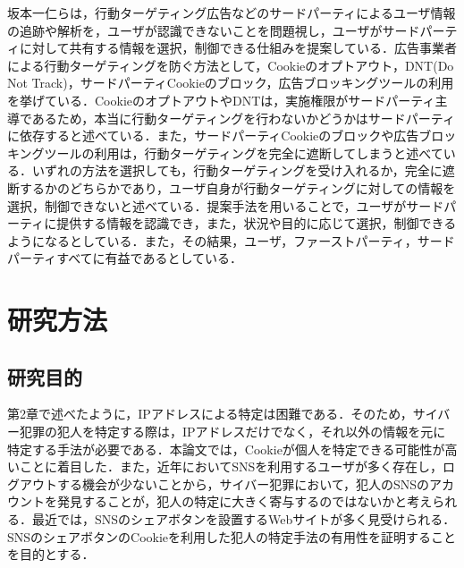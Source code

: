 \documentclass[10pt, a4paper]{jreport}
\begin{document}
坂本一仁らは，行動ターゲティング広告などのサードパーティによるユーザ情報の追跡や解析を，ユーザが認識できないことを問題視し，ユーザがサードパーティに対して共有する情報を選択，制御できる仕組みを提案している\cite{relevant_research_first_party_third_party}．広告事業者による行動ターゲティングを防ぐ方法として，Cookieのオプトアウト，DNT(Do Not Track)，サードパーティCookieのブロック，広告ブロッキングツールの利用を挙げている．CookieのオプトアウトやDNTは，実施権限がサードパーティ主導であるため，本当に行動ターゲティングを行わないかどうかはサードパーティに依存すると述べている．また，サードパーティCookieのブロックや広告ブロッキングツールの利用は，行動ターゲティングを完全に遮断してしまうと述べている．いずれの方法を選択しても，行動ターゲティングを受け入れるか，完全に遮断するかのどちらかであり，ユーザ自身が行動ターゲティングに対しての情報を選択，制御できないと述べている．提案手法を用いることで，ユーザがサードパーティに提供する情報を認識でき，また，状況や目的に応じて選択，制御できるようになるとしている．また，その結果，ユーザ，ファーストパーティ，サードパーティすべてに有益であるとしている．












\chapter{研究方法}
\section{研究目的}

第2章で述べたように，IPアドレスによる特定は困難である．そのため，サイバー犯罪の犯人を特定する際は，IPアドレスだけでなく，それ以外の情報を元に特定する手法が必要である．本論文では，Cookieが個人を特定できる可能性が高いことに着目した．また，近年においてSNSを利用するユーザが多く存在し，ログアウトする機会が少ないことから，サイバー犯罪において，犯人のSNSのアカウントを発見することが，犯人の特定に大きく寄与するのではないかと考えられる．最近では，SNSのシェアボタンを設置するWebサイトが多く見受けられる．SNSのシェアボタンのCookieを利用した犯人の特定手法の有用性を証明することを目的とする．
\end{document}

